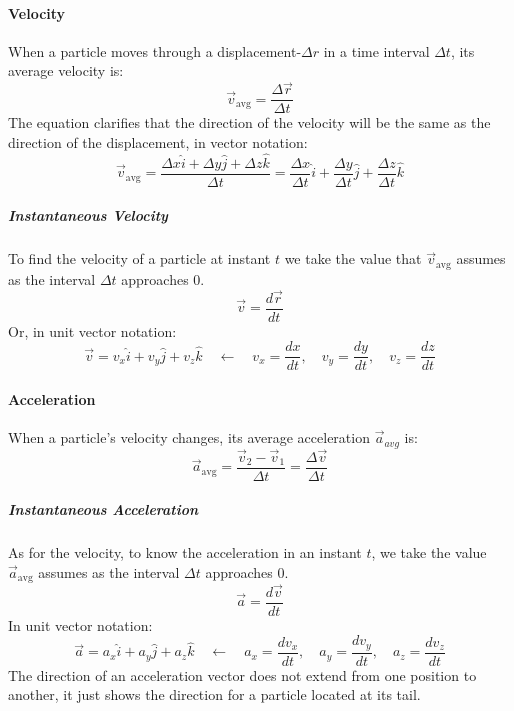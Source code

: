 \paragraph{Velocity} When a particle moves through a displacement-$\Delta r$ in a time interval $\Delta t$, its average velocity is:
\begin{equation}
\vec{v}_{\mathrm{avg}} = \frac{\Delta\vec{r}}{\Delta t}
\end{equation}
The equation clarifies that the direction of the velocity will be the same as the direction of the displacement, in vector notation:
\begin{equation}
\vec{v}_{\mathrm{avg}} = \frac{\Delta x \hat{i} + \Delta y \hat{j} + \Delta z \hat{k}}{\Delta t} = \frac{\Delta x}{\Delta t} \hat{i} + \frac{\Delta y}{\Delta t} \hat{j} + \frac{\Delta z}{\Delta t} \hat{k}
\end{equation}
\subparagraph{Instantaneous Velocity} To find the velocity of a particle at instant $t$ we take the value that $\vec{v}_{\mathrm{avg}}$ assumes as the interval $\Delta t$ approaches $0$.
\begin{equation}
\vec{v} = \frac{d\vec{r}}{dt}
\end{equation}
Or, in unit vector notation:
\begin{equation}
\vec{v} = v_x \hat{i} + v_y \hat{j} + v_z \hat{k}\quad \leftarrow\quad v_x= \frac{dx}{dt},\quad v_y= \frac{dy}{dt},\quad v_z= \frac{dz}{dt}
\end{equation}
\paragraph{Acceleration} When a particle's velocity changes, its average acceleration $\vec{a}_{avg}$ is:
\begin{equation}
\vec{a}_{\mathrm{avg}} = \frac{\vec{v}_2 - \vec{v}_1}{\Delta t} = \frac{\Delta \vec{v} }{\Delta t}
\end{equation}
\subparagraph{Instantaneous Acceleration} As for the velocity, to know the acceleration in an instant $t$, we take the value $\vec{a}_{\mathrm{avg}}$ assumes as the interval $\Delta{t}$ approaches $0$.
\begin{equation}
\vec{a} = \frac{d\vec{v}}{dt}
\end{equation}
In unit vector notation:
\begin{equation}
\vec{a} = a_x \hat{i} + a_y \hat{j} + a_z \hat{k}\quad\leftarrow\quad a_x = \frac{dv_x}{dt},\quad a_y = \frac{dv_y}{dt},\quad a_z = \frac{dv_z}{dt}
\end{equation}
The direction of an acceleration vector does not extend from one position to another, it just shows the direction for a particle located at its tail.
